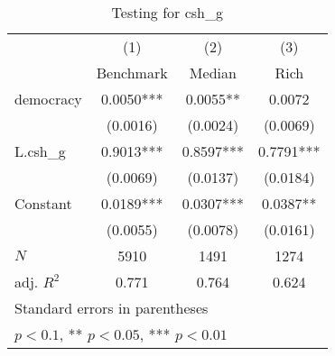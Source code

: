 \begin{table}[htbp]\centering
\def\sym#1{\ifmmode^{#1}\else\(^{#1}\)\fi}
\caption{Testing for csh\_g \label{tab:regression3}}
\begin{tabular}{l*{3}{c}}
\hline\hline
            &\multicolumn{1}{c}{(1)}&\multicolumn{1}{c}{(2)}&\multicolumn{1}{c}{(3)}\\
            &\multicolumn{1}{c}{Benchmark}&\multicolumn{1}{c}{Median}&\multicolumn{1}{c}{Rich}\\
\hline
democracy   &      0.0050***&      0.0055** &      0.0072   \\
            &    (0.0016)   &    (0.0024)   &    (0.0069)   \\
[1em]
L.csh\_g     &      0.9013***&      0.8597***&      0.7791***\\
            &    (0.0069)   &    (0.0137)   &    (0.0184)   \\
[1em]
Constant    &      0.0189***&      0.0307***&      0.0387** \\
            &    (0.0055)   &    (0.0078)   &    (0.0161)   \\
\hline
\(N\)       &        5910   &        1491   &        1274   \\
adj. \(R^{2}\)&       0.771   &       0.764   &       0.624   \\
\hline\hline
\multicolumn{4}{l}{\footnotesize Standard errors in parentheses}\\
\multicolumn{4}{l}{\footnotesize * \(p<0.1\), ** \(p<0.05\), *** \(p<0.01\)}\\
\end{tabular}
\end{table}
